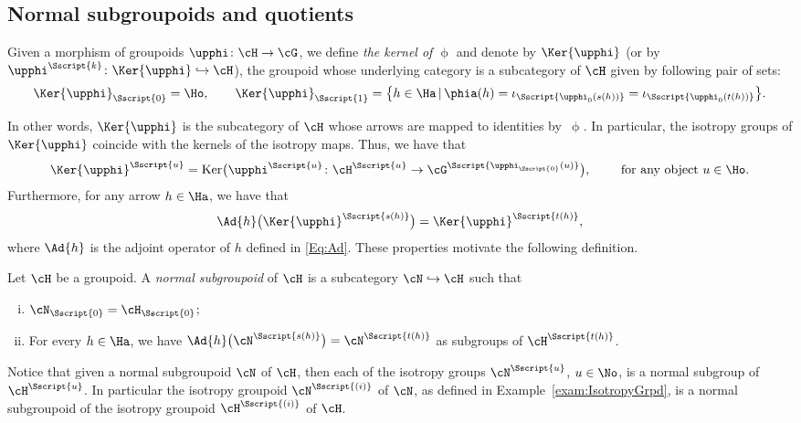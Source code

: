 \subsection{Normal subgroupoids and quotients}\label{ssec:normal}
Given a morphism of groupoids $\upphi\colon \cH \to \cG$, we define \emph{the kernel of $\upphi$} and denote by $\Ker{\upphi}$ (or by $\upphi^{\Sscript{k}}\colon \Ker{\upphi} \hookrightarrow \cH$), the groupoid whose underlying category is a subcategory of $\cH$ given by following pair of sets:
\begin{gather*}
\Ker{\upphi}_{\Sscript{0}}=\Ho,\qquad \Ker{\upphi}_{\Sscript{1}}=\big\{ h \in \Ha\,|\, \phia(h)=\iota_{\Sscript{ \upphi_0( s(h))}}= \iota_{\Sscript{\upphi_0( t(h))}}\big\}.
\end{gather*}

In other words, $\Ker{\upphi}$ is the subcategory of $\cH$ whose arrows are mapped to identities by~$\upphi$. In particular, the isotropy groups of $\Ker{\upphi}$ coincide with the kernels of the isotropy maps. Thus, we have that
\begin{gather*}
\Ker{\upphi}^{\Sscript{u}}= {\rm Ker}\big(\upphi^{\Sscript{u}}\colon \cH^{\Sscript{u}} \to \cG^{\Sscript{\upphi_{\Sscript{0}}(u)}} \big),\qquad \text{ for any object } u \in \Ho.
\end{gather*}
Furthermore, for any arrow $h \in \Ha$, we have that
\begin{gather*}
\Ad{h}\big( \Ker{\upphi}^{\Sscript{s(h)}} \big) = \Ker{\upphi}^{\Sscript{t(h)}},
\end{gather*}
where $\Ad{h}$ is the adjoint operator of $h$ defined in \eqref{Eq:Ad}. These properties motivate the following definition.
\begin{Definition}\label{def:Normal}Let $\cH$ be a groupoid. A \emph{normal subgroupoid} of $\cH$ is a subcategory $\cN \hookrightarrow \cH$ such that
\begin{enumerate}[(i)]
\item $\cN_{\Sscript{0}} =\cH_{\Sscript{0}}$;
\item For every $h \in \Ha$, we have $\Ad{h}\big(\cN^{\Sscript{s(h)}}\big) = \cN^{\Sscript{t(h)}} $ as subgroups of $\cH^{\Sscript{t(h)}}$.
\end{enumerate}
\end{Definition}
Notice that given a normal subgroupoid $\cN$ of $\cH$, then each of the isotropy groups $\cN^{\Sscript{u}}$, $u \in \No$, is a normal subgroup of $\cH^{\Sscript{u}}$. In particular the isotropy groupoid $\cN^{\Sscript{(i)}}$ of $\cN$, as defined in Example~\ref{exam:IsotropyGrpd}, is a normal subgroupoid of the isotropy groupoid $\cH^{\Sscript{(i)}}$ of $\cH$.
